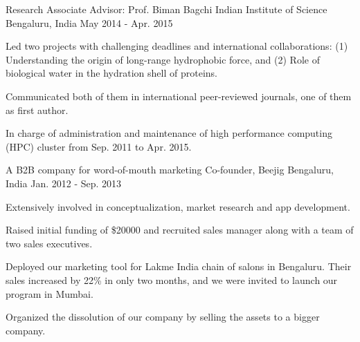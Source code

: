 \begin{cventries}

\cventry
{Research Associate \quad\textbar\quad Advisor: Prof. Biman Bagchi} %
{Indian Institute of Science} %
{Bengaluru, India} %
{May 2014 - Apr. 2015} %
{ %
\begin{cvitems}
\item {Led two projects with challenging deadlines and international collaborations: (1) Understanding the origin of long-range hydrophobic force, and (2) Role of biological water in the hydration shell of proteins.}
\item {Communicated both of them in international peer-reviewed journals, one of them as first author.}
\item {In charge of administration and maintenance of high performance computing (HPC) cluster from Sep. 2011 to Apr. 2015.}
\end{cvitems}
}


\cventry
{A B2B company for word-of-mouth marketing} %
{Co-founder, Beejig} %
{Bengaluru, India} %
{Jan. 2012 - Sep. 2013} %
{ %
\begin{cvitems}
\item {Extensively involved in conceptualization, market research and app development.}
\item {Raised initial funding of \$20000 and recruited sales manager along with a team of two sales executives.}
\item {Deployed our marketing tool for Lakme India chain of salons in Bengaluru. Their sales increased by 22\% in only two months, and we were invited to launch our program in Mumbai.}
\item {Organized the dissolution of our company by selling the assets to a bigger company.}
\end{cvitems}
}


\end{cventries}
